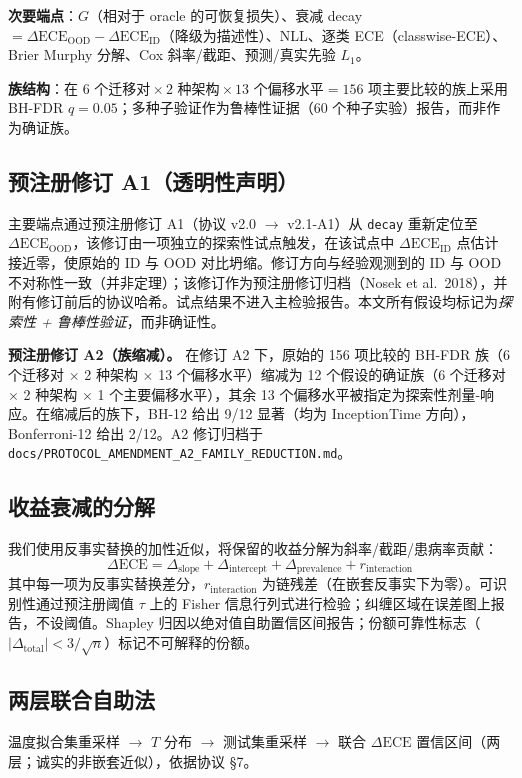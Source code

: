 \textbf{次要端点}：$G$（相对于 oracle 的可恢复损失）、衰减 decay $=\Delta\text{ECE}_{\text{OOD}}-\Delta\text{ECE}_{\text{ID}}$（降级为描述性）、NLL、逐类 ECE（classwise-ECE）、Brier Murphy 分解、Cox 斜率/截距、预测/真实先验 $L_1$。

\textbf{族结构}：在 $6\text{ 个迁移对}\times 2\text{ 种架构}\times 13\text{ 个偏移水平}=156$ 项主要比较的族上采用 BH-FDR $q=0.05$；多种子验证作为鲁棒性证据（60 个种子实验）报告，而非作为确证族。

\subsection{预注册修订 A1（透明性声明）}
主要端点通过预注册修订 A1（协议 v2.0 $\rightarrow$ v2.1-A1）从 \texttt{decay} 重新定位至 $\Delta\text{ECE}_{\text{OOD}}$，该修订由一项独立的探索性试点触发，在该试点中 $\Delta\text{ECE}_{\text{ID}}$ 点估计接近零，使原始的 ID 与 OOD 对比坍缩。修订方向与经验观测到的 ID 与 OOD 不对称性一致（并非定理）；该修订作为预注册修订归档（Nosek et al.\ 2018），并附有修订前后的协议哈希。试点结果不进入主检验报告。本文所有假设均标记为\emph{探索性 + 鲁棒性验证}，而非确证性。

\textbf{预注册修订 A2（族缩减）。} 在修订 A2 下，原始的 156 项比较的 BH-FDR 族（6 个迁移对 $\times$ 2 种架构 $\times$ 13 个偏移水平）缩减为 12 个假设的确证族（6 个迁移对 $\times$ 2 种架构 $\times$ 1 个主要偏移水平），其余 13 个偏移水平被指定为探索性剂量-响应。在缩减后的族下，BH-12 给出 9/12 显著（均为 InceptionTime 方向），Bonferroni-12 给出 2/12。A2 修订归档于 \texttt{docs/PROTOCOL\_AMENDMENT\_A2\_}\allowbreak\texttt{FAMILY\_REDUCTION.md}。

\subsection{收益衰减的分解}
\label{sec:decomp}
我们使用反事实替换的加性近似，将保留的收益分解为斜率/截距/患病率贡献：
\begin{equation}
    \Delta\text{ECE} = \Delta_{\text{slope}}
    + \Delta_{\text{intercept}}
    + \Delta_{\text{prevalence}}
    + r_{\text{interaction}}
\end{equation}
其中每一项为反事实替换差分，$r_{\text{interaction}}$ 为链残差（在嵌套反事实下为零）。可识别性通过预注册阈值 $\tau$ 上的 Fisher 信息行列式进行检验；纠缠区域在误差图上报告，不设阈值。Shapley 归因以绝对值自助置信区间报告；份额可靠性标志（$|\Delta_{\text{total}}|<3/\sqrt{n}$）标记不可解释的份额。

\subsection{两层联合自助法}
温度拟合集重采样 $\rightarrow$ $T$ 分布 $\rightarrow$ 测试集重采样 $\rightarrow$ 联合 $\Delta\text{ECE}$ 置信区间（两层；诚实的非嵌套近似），依据协议 \S7。

